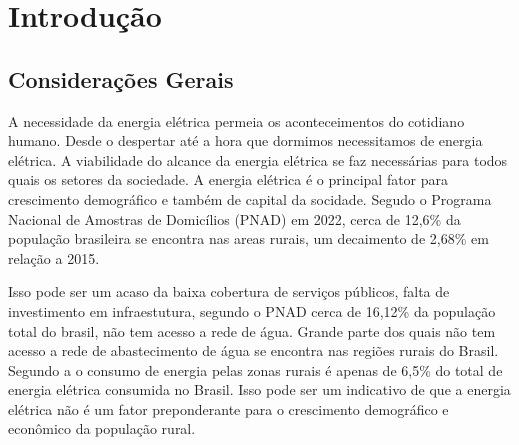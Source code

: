 \documentclass[oneside,openright,12pt]{ufsm_2021} %
\author{Leonardo Felipe da Silva dos Santos}   %
\begin{document}
\pretextual  %


\chapter{Introdução}
\section{Considerações Gerais}

\par A necessidade da energia elétrica permeia os aconteceimentos do cotidiano humano. Desde o despertar até a hora que dormimos necessitamos de energia elétrica. A viabilidade do alcance da energia elétrica se faz necessárias para todos quais os setores da sociedade. A energia elétrica é o principal fator para crescimento demográfico e também de capital da socidade. Segudo o Programa Nacional de Amostras de Domicílios (PNAD) em 2022, cerca de 12,6\% da população brasileira se encontra nas areas rurais, um decaimento de 2,68\% em relação a 2015.

\par Isso pode ser um acaso da baixa cobertura de serviços públicos, falta de investimento em infraestutura, segundo o PNAD cerca de 16,12\% da população total do brasil, não tem acesso a rede de água. Grande parte dos quais não tem acesso a rede de abastecimento de água se encontra nas regiões rurais do Brasil. Segundo a \cite{epe_balanco_2024} o consumo de energia pelas zonas rurais é apenas de 6,5\% do total de energia elétrica consumida no Brasil. Isso pode ser um indicativo de que a energia elétrica não é um fator preponderante para o crescimento demográfico e econômico da população rural.
\end{document}
